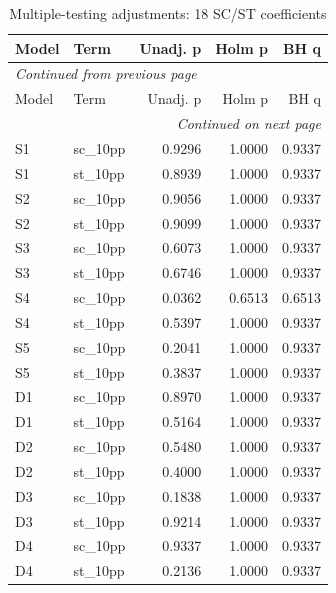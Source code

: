 \documentclass[11pt,a4paper]{report}
\begin{document}
\begin{longtable}{llrrr}
\caption{Multiple-testing adjustments: 18 SC/\allowbreak{}ST coefficients}\\\toprule
Model & Term & Unadj. p & Holm p & BH q \\\midrule\endfirsthead
\multicolumn{5}{l}{\textit{Continued from previous page}}\\\toprule
Model & Term & Unadj. p & Holm p & BH q \\\midrule\endhead
\midrule\multicolumn{5}{r}{\textit{Continued on next page}}\\\endfoot\bottomrule\endlastfoot
S1 & sc\_10pp & 0.9296 & 1.0000 & 0.9337 \\
S1 & st\_10pp & 0.8939 & 1.0000 & 0.9337 \\
S2 & sc\_10pp & 0.9056 & 1.0000 & 0.9337 \\
S2 & st\_10pp & 0.9099 & 1.0000 & 0.9337 \\
S3 & sc\_10pp & 0.6073 & 1.0000 & 0.9337 \\
S3 & st\_10pp & 0.6746 & 1.0000 & 0.9337 \\
S4 & sc\_10pp & 0.0362 & 0.6513 & 0.6513 \\
S4 & st\_10pp & 0.5397 & 1.0000 & 0.9337 \\
S5 & sc\_10pp & 0.2041 & 1.0000 & 0.9337 \\
S5 & st\_10pp & 0.3837 & 1.0000 & 0.9337 \\
D1 & sc\_10pp & 0.8970 & 1.0000 & 0.9337 \\
D1 & st\_10pp & 0.5164 & 1.0000 & 0.9337 \\
D2 & sc\_10pp & 0.5480 & 1.0000 & 0.9337 \\
D2 & st\_10pp & 0.4000 & 1.0000 & 0.9337 \\
D3 & sc\_10pp & 0.1838 & 1.0000 & 0.9337 \\
D3 & st\_10pp & 0.9214 & 1.0000 & 0.9337 \\
D4 & sc\_10pp & 0.9337 & 1.0000 & 0.9337 \\
D4 & st\_10pp & 0.2136 & 1.0000 & 0.9337 \\
\end{longtable}\endgroup
\begingroup\footnotesize\setlength{\tabcolsep}{4pt}
\end{document}
